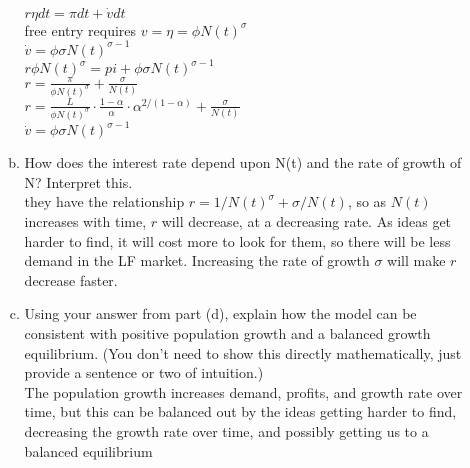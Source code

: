 \documentclass[11pt]{article}
\begin{document}
\begin{itemize}
\begin{enumerate}[(a)]
\\$r\eta dt=\pi dt+\dot v dt$
\\free entry requires $v=\eta=\phi N(t)^\sigma$
\\$\dot v=\phi\sigma N(t)^{\sigma-1}$
\\$r\phi N(t)^\sigma=pi+\phi\sigma N(t)^{\sigma-1}$
\\$r=\frac{\pi}{\phi N(t)^\sigma}+\frac{\sigma}{N(t)}$
\\$r=\frac{L}{\phi N(t)^\sigma}\cdot\frac{1-\alpha}{\alpha}\cdot\alpha^{2/(1-\alpha)}+\frac{\sigma}{N(t)}$
\\$\dot v=\phi\sigma N(t)^{\sigma-1}$
\item How does the interest rate depend upon N(t) and the rate of growth of N? Interpret this.
\\they have the relationship $r=1/N(t)^\sigma+\sigma/N(t)$, so as $N(t)$ increases with time, $r$ will decrease, at a decreasing rate. As ideas get harder to find, it will cost more to look for them, so there will be less demand in the LF market. Increasing the rate of growth $\sigma$ will make $r$ decrease faster.
\item Using your answer from part (d), explain how the model can be consistent with positive population growth and a balanced growth equilibrium. (You don't need to show this directly mathematically, just provide a sentence or two of intuition.)
\\The population growth increases demand, profits, and growth rate over time, but this can be balanced out by the ideas getting harder to find, decreasing the growth rate over time, and possibly getting us to a balanced equilibrium
\end{enumerate}


\newpage

\vspace{0.1in}


\end{itemize}
\end{document}
